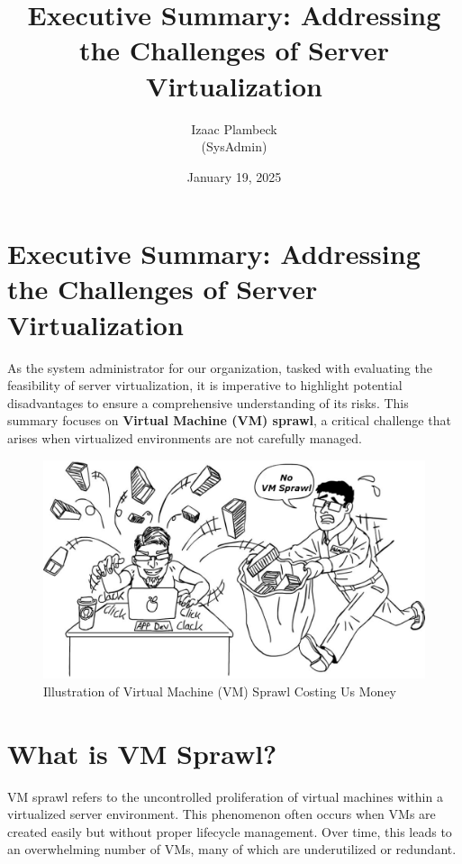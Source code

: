 \documentclass[11pt,a4paper,twocolumn]{article}
\title{\ttfamily Executive Summary: Addressing the Challenges of Server Virtualization} %
\author{\sffamily Izaac Plambeck \\ (SysAdmin)} %
\date{\sffamily January 19, 2025} %
\begin{document}
\twocolumn[
\begin{@twocolumnfalse}
\maketitle
\end{@twocolumnfalse}
]

\section{Executive Summary: Addressing the Challenges of Server Virtualization}
As the system administrator for our organization, tasked with evaluating the feasibility of server virtualization, it is imperative to highlight potential disadvantages to ensure a comprehensive understanding of its risks. This summary focuses on \textbf{Virtual Machine (VM) sprawl}, a critical challenge that arises when virtualized environments are not carefully managed.

\begin{figure}[H] %
    \centering
    \includegraphics[width=0.8\linewidth]{novmsprawl.png}
    \caption{\sffamily Illustration of Virtual Machine (VM) Sprawl Costing Us Money} %
    \label{fig:vm_sprawl}
\end{figure}

\section{What is VM Sprawl?}
VM sprawl refers to the uncontrolled proliferation of virtual machines within a virtualized server environment. This phenomenon often occurs when VMs are created easily but without proper lifecycle management. Over time, this leads to an overwhelming number of VMs, many of which are underutilized or redundant.
\end{document}
